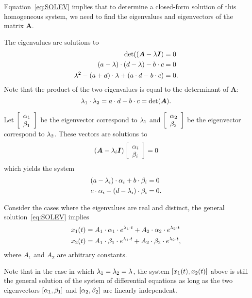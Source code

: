 \documentclass[letterpaper,12pt,leqno]{article}
\begin{document}
Equation~\eqref{eq:SOLEV} implies that to determine a closed-form solution of this homogeneous system, we need to find the eigenvalues and eigenvectors of the matrix $\bm{A}$.

The eigenvalues are solutions to 
\begin{align*}
\det( \left( \bm{A}-\lambda \bm{I} \right) &=0\\
\left( a-\lambda \right) \cdot \left( d-\lambda \right) -b\cdot c &=0 \\
\lambda ^{2}-\left( a+d \right)\cdot  \lambda +\left( a\cdot d-b\cdot c \right) &=0.
\end{align*}
Note that the product of the two eigenvalues is equal to the determinant of $
\bm{A}$:
\begin{equation}
\lambda_{1}\cdot \lambda_{2}=a\cdot d-b\cdot c=\det(\bm{A}).\label{eq:DETL}
\end{equation}

Let $\left[ 
\begin{array}{l}
\alpha_{1} \\ 
\beta_{1}
\end{array}
 \right] $ be the eigenvector correspond to $\lambda_{1}$ and $\left[ 
\begin{array}{l}
\alpha_{2} \\ 
\beta_{2}
\end{array} \right] $ be the eigenvector correspond to $\lambda_{2}$. These vectors are solutions to 
\begin{equation*}
\left( \bm{A}-\lambda_{i}\bm{I} \right) \left[ 
\begin{array}{l}
\alpha_{i} \\ 
\beta_{i}
\end{array} \right] =0
\end{equation*}
which yields the system
\begin{align*}
\left( a-\lambda_{i} \right)\cdot  \alpha_{i}+b\cdot \beta _{i} &=0 \\
c\cdot \alpha_{i}+\left( d-\lambda_{i} \right)\cdot  \beta _{i} &=0.
\end{align*}

Consider the cases where the eigenvalues are real and distinct, the general
solution~\eqref{eq:SOLEV} implies
\begin{align*}
x_{1}(t) &=A_{1}\cdot \alpha_{1}\cdot e^{\lambda_{1}\cdot t}+A_{2}\cdot \alpha_{2}\cdot e^{\lambda_{2}\cdot t}\\
x_{2}(t) &=A_{1}\cdot \beta_{1}\cdot e^{\lambda_{1}\cdot t}+A_{2}\cdot \beta_{2}\cdot e^{\lambda_{2}\cdot t},
\end{align*}
where $A_{1}$ and $A_{2}$ are arbitrary constants. 

Note that in the case in which $\lambda_{1}=\lambda_{2}=\lambda$, the system $\left[ x_{1}(t),x_{2}(t) \right]$ above is still the general solution of the system of differential equations as long as the two eigenvectors $\left[ \alpha_{1},\beta_{1} \right]$ and $\left[ \alpha_{2},\beta_{2} \right]$ are linearly independent.
\end{document}
